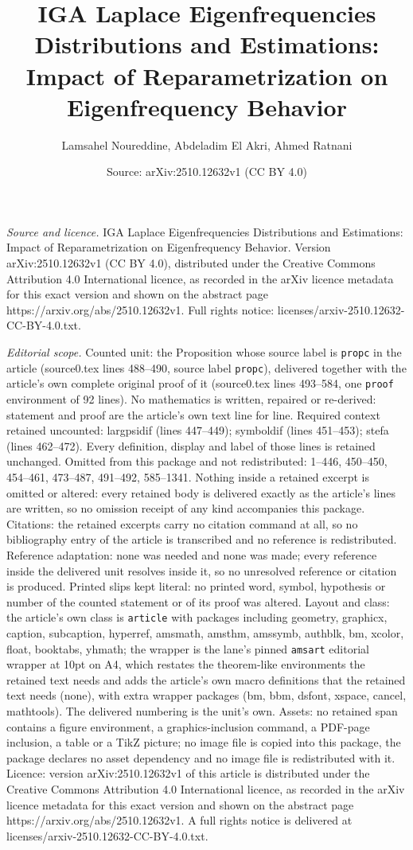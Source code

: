 \documentclass[10pt,a4paper]{amsart}
\title[IGA Laplace Eigenfrequencies Distributions and Estimations: ]{IGA Laplace Eigenfrequencies Distributions and Estimations: Impact of Reparametrization on Eigenfrequency Behavior}
\author{Lamsahel Noureddine, Abdeladim El Akri, Ahmed Ratnani}
\date{Source: arXiv:2510.12632v1 (CC BY 4.0)}
\begin{document}
\maketitle

\noindent\emph{Source and licence.} IGA Laplace Eigenfrequencies Distributions and Estimations: Impact of Reparametrization on Eigenfrequency Behavior. Version arXiv:2510.12632v1 (CC BY 4.0), distributed under the Creative Commons Attribution 4.0 International licence, as recorded in the arXiv licence metadata for this exact version and shown on the abstract page https://arxiv.org/abs/2510.12632v1. Full rights notice: licenses/arxiv-2510.12632-CC-BY-4.0.txt.\par\smallskip

\noindent\textit{Editorial scope.} Counted unit: the Proposition whose source label is \texttt{propc} in the article (source0.tex lines 488--490, source label \texttt{propc}), delivered together with the article's own complete original proof of it (source0.tex lines 493--584, one \texttt{proof} environment of 92 lines). No mathematics is written, repaired or re-derived: statement and proof are the article's own text line for line. Required context retained uncounted: largpsidif (lines 447--449); symboldif (lines 451--453); stefa (lines 462--472). Every definition, display and label of those lines is retained unchanged. Omitted from this package and not redistributed: 1--446, 450--450, 454--461, 473--487, 491--492, 585--1341. Nothing inside a retained excerpt is omitted or altered: every retained body is delivered exactly as the article's lines are written, so no omission receipt of any kind accompanies this package. Citations: the retained excerpts carry no citation command at all, so no bibliography entry of the article is transcribed and no reference is redistributed. Reference adaptation: none was needed and none was made; every reference inside the delivered unit resolves inside it, so no unresolved reference or citation is produced. Printed slips kept literal: no printed word, symbol, hypothesis or number of the counted statement or of its proof was altered. Layout and class: the article's own class is \texttt{article} with packages including geometry, graphicx, caption, subcaption, hyperref, amsmath, amsthm, amssymb, authblk, bm, xcolor, float, booktabs, yhmath; the wrapper is the lane's pinned \texttt{amsart} editorial wrapper at 10pt on A4, which restates the theorem-like environments the retained text needs and adds the article's own macro definitions that the retained text needs (none), with extra wrapper packages (bm, bbm, dsfont, xspace, cancel, mathtools). The delivered numbering is the unit's own. Assets: no retained span contains a figure environment, a graphics-inclusion command, a PDF-page inclusion, a table or a TikZ picture; no image file is copied into this package, the package declares no asset dependency and no image file is redistributed with it. Licence: version arXiv:2510.12632v1 of this article is distributed under the Creative Commons Attribution 4.0 International licence, as recorded in the arXiv licence metadata for this exact version and shown on the abstract page https://arxiv.org/abs/2510.12632v1. A full rights notice is delivered at licenses/arxiv-2510.12632-CC-BY-4.0.txt. 
\end{document}
